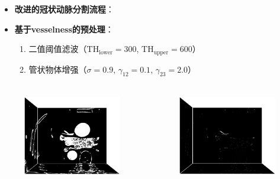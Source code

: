 \begin{frame}
\begin{itemize}
  \item \textbf{改进的冠状动脉分割流程}：
\end{itemize}
\begin{figure}[t]
\centering

\end{figure}
\end{frame}

\begin{frame}
\begin{itemize}
  \item \textbf{基于vesselness的预处理}：
  \begin{enumerate}
     \item 二值阈值滤波（$\text{TH}_{\text{lower}} = 300$, $\text{TH}_{\text{upper}} = 600$）
     \item 管状物体增强（$\sigma = 0.9$, $\gamma_{12} = 0.1$, $\gamma_{23} = 2.0$）
  \end{enumerate}
\end{itemize}
\begin{columns}[b,onlytextwidth]
\begin{column}{.5\textwidth}
 \begin{figure}[t]
\centering
\includegraphics[height=1.5in]{../../Figures/coronary/coronary_enhanced/binary1.eps}
\end{figure}
\end{column}
\begin{column}{.5\textwidth}
 \begin{figure}[t]
\centering
\includegraphics[height=1.5in]{../../Figures/coronary/coronary_enhanced/hessian.eps}
\end{figure}
\end{column}
\end{columns}
\end{frame}

